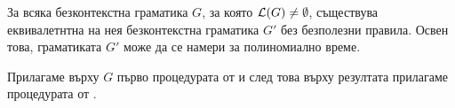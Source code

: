 \begin{hint}
\end{hint}

\begin{thm}
  За всяка безконтекстна граматика $G$, за която $\mathcal{L}(G) \neq \emptyset$, съществува еквивалетнтна на нея безконтекстна граматика $G'$ без безполезни правила.
  Освен това, граматиката $G'$ може да се намери за полиномиално време.
\end{thm}
\begin{hint}
  Прилагаме върху $G$ първо процедурата от  и след това върху резултата прилагаме процедурата от .
\end{hint}

